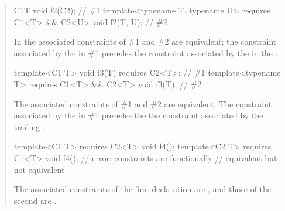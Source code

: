 \begin{quote}
\begin{codeblock}
C1{T} void f2(C2);                                                      // \#1
template<typename T, typename U> requires C1<T> && C2<U> void f2(T, U); // \#2
\end{codeblock}
% 
In the associated constraints of \#1 and \#2 are equivalent; the constraint
associated by the  in \#1 precedes the
constraint associated by the  in
the .
% 
\begin{codeblock}
template<C1 T> void f3(T) requires C2<T>;                // \#1
template<typename T> requires C1<T> && C2<T> void f3(T); // \#2
\end{codeblock}
The associated constraints of \#1 and \#2 are equivalent. The constraint
associated by the  in \#1 precedes the
the constraint associated by the trailing .
% 
\begin{codeblock}
template<C1 T> requires C2<T> void f4();
template<C2 T> requires C1<T> void f4(); // error: constraints are functionally
                                         // equivalent but not equivalent
\end{codeblock}
% 
The associated constraints of the first declaration are
, and those of the second are
.
\exitexample
\end{quote}


